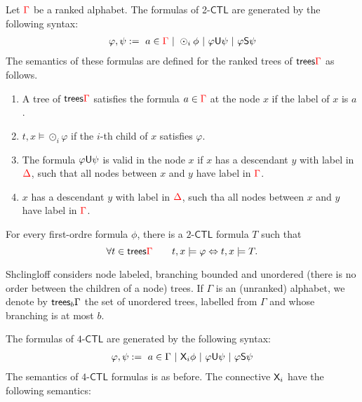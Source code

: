 Let ${\color{red}{\Gamma}}$ be a ranked alphabet. The formulas of 2-$\mathsf{CTL}$ are generated by the following syntax:
\begin{align*}
\varphi, \psi:= \ a\in {\color{red}{\Gamma}} \ | \ \odot_i \phi \ | \ \varphi\mathsf U \psi \ | \ \varphi\mathsf S\psi  
\end{align*}
The semantics of these formulas are defined for the ranked trees of $\mathsf {trees} {\color{red}{\Gamma}}$ as follows.
\begin{enumerate}
\item A tree of $\mathsf {trees} {\color{red}{\Gamma}}$ satisfies the formula $a\in{\color{red}{\Gamma}}$ at the node $x$ if the label of $x$ is $a$.
\item $t, x\models \odot_i \varphi$ if the $i$-th child of $x$ satisfies $\varphi$.
\item  The formula $\varphi\mathsf U \psi$  is valid  in the node $x$ if $x$ has a descendant $y$ with label in ${\color{red}{\Delta}}$, such that all nodes between $x$ and $y$ have label in ${\color{red}{\Gamma}}$. 
\item $x$ has a descendant $y$ with label in ${\color{red}{\Delta}}$, such tha all nodes between $x$ and $y$ have label in ${\color{red}{\Gamma}}$.
\end{enumerate}

\begin{lemma}%
For every first-ordre formula $\phi$, there is a $2$-$\mathsf{CTL}$ formula $T$ such that
$$ \forall t\in \mathsf {trees} {\color{red}{\Gamma}} \qquad t,x\models \varphi \Leftrightarrow t,x\models T.$$
\end{lemma}

Shclingloff considers node labeled, branching bounded and   unordered (there is no order between the children of a node) trees. If $\Gamma$ is an (unranked) alphabet, we denote by $\mathsf {trees}_b\Gamma$ the set of unordered trees, labelled from $\Gamma$ and whose branching is at most $b$.   


The formulas of $4$-$\mathsf{CTL}$ are generated by the following syntax:
\begin{align*}
\varphi, \psi:= \ a\in \Gamma \ | \ \nextmod_i \phi \ | \ \varphi\untilmod \psi \ | \ \varphi\sincemod\psi  
\end{align*}
The semantics of $4$-$\mathsf{CTL}$ formulas is as before. The connective $\mathsf X_i$ have the following semantics:
%
 
